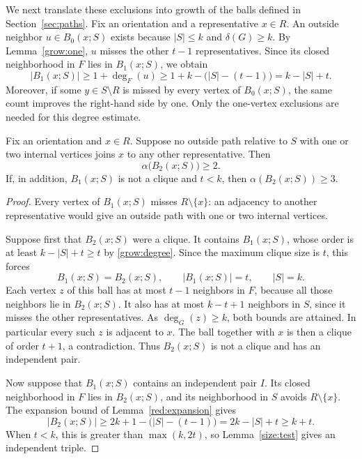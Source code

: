 We next translate these exclusions into growth of the balls defined
in Section~\ref{sec:paths}.  Fix an orientation and a representative
$x\in R$.  An outside neighbor $u\in B_0(x;S)$ exists because
$|S|\le k$ and $\delta(G)\ge k$.  By Lemma~\ref{grow:one}, $u$ misses
the other $t-1$ representatives.  Since its closed neighborhood in
$F$ lies in $B_1(x;S)$, we obtain
\begin{equation}\label{grow:degree}
 |B_1(x;S)|
 \ge 1+\deg_F(u)
 \ge 1+k-\bigl(|S|-(t-1)\bigr)
 =k-|S|+t.
\end{equation}
Moreover, if some $y\in S\setminus R$ is missed by every vertex of
$B_0(x;S)$, the same count improves the right-hand side by one.
Only the one-vertex exclusions are needed for this degree estimate.

\begin{lemma}\label{grow:weights}
Fix an orientation and $x\in R$.  Suppose no outside path relative
to $S$ with one or two internal vertices joins $x$ to any other
representative.  Then
\[
 \alpha\bigl(B_2(x;S)\bigr)\ge 2.
\]
If, in addition, $B_1(x;S)$ is not a clique and $t<k$, then
$\alpha(B_2(x;S))\ge 3$.
\end{lemma}

\begin{proof}
Every vertex of $B_1(x;S)$ misses $R\setminus\{x\}$: an adjacency
to another representative would give an outside path with one or
two internal vertices.

Suppose first that $B_2(x;S)$ were a clique.  It contains
$B_1(x;S)$, whose order is at least $k-|S|+t\ge t$ by
\eqref{grow:degree}.  Since the maximum clique size is $t$, this forces
\[
 B_1(x;S)=B_2(x;S),\qquad |B_1(x;S)|=t,\qquad |S|=k.
\]
Each vertex $z$ of this ball has at most $t-1$ neighbors in $F$,
because all those neighbors lie in $B_2(x;S)$.  It also has at most
$k-t+1$ neighbors in $S$, since it misses the other representatives.
As $\deg_G(z)\ge k$, both bounds are attained.  In particular every
such $z$ is adjacent to $x$.  The ball together with $x$ is then a
clique of order $t+1$, a contradiction.  Thus $B_2(x;S)$ is not a
clique and has an independent pair.

Now suppose that $B_1(x;S)$ contains an independent pair $I$.
Its closed neighborhood in $F$ lies in $B_2(x;S)$, and its
neighborhood in $S$ avoids $R\setminus\{x\}$.  The expansion bound
of Lemma~\ref{red:expansion} gives
\begin{equation}\label{grow:pair-expansion}
 |B_2(x;S)|
 \ge 2k+1-\bigl(|S|-(t-1)\bigr)
 =2k-|S|+t
 \ge k+t.
\end{equation}
When $t<k$, this is greater than $\max(k,2t)$, so
Lemma~\ref{size:test} gives an independent triple.
\end{proof}

